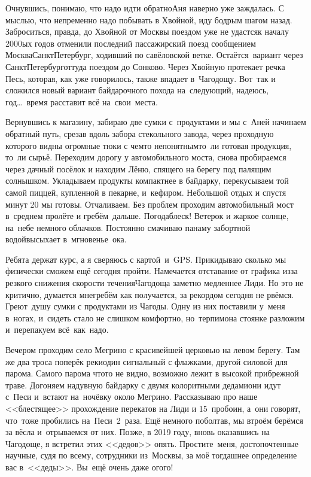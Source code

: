 Очнувшись, понимаю, что надо идти обратно\mdash Аня наверно уже заждалась. С мыслью, что непременно надо побывать в Хвойной, иду бодрым шагом назад. Заброситься, правда, до Хвойной от Москвы поездом уже не удастся\mdash к началу 2000\sdash ых годов отменили последний пассажирский поезд сообщением Москва\mdash Санкт\sdash Петербург, ходивший по савёловской ветке. Остаётся~вариант через Санкт\sdash Петербург\mdash оттуда поездом до Сонково. Через Хвойную протекает речка Песь, которая, как уже говорилось, также впадает в~Чагодощу. Вот~так и сложился новый вариант байдарочного похода на~следующий, надеюсь, год\ldots~время расставит всё на~свои~места.

Вернувшись к магазину, забираю две сумки с~продуктами и мы с~Аней начинаем обратный путь, срезав вдоль забора стекольного завода, через проходную которого видны огромные тюки с чем\sdash то непонятным\mdash то~ли готовая продукция, то~ли сырьё. Переходим дорогу у автомобильного моста, снова пробираемся через дачный посёлок и находим Лёню, спящего на берегу под палящим солнышком. Укладываем продукты компактнее в байдарку, перекусываем той самой пиццей, купленной в пекарне, и~кефиром. Небольшой отдых и спустя минут 20 мы готовы. Отчаливаем. Без проблем проходим автомобильный мост в~среднем пролёте и гребём~дальше. Погода\mdash блеск! Ветерок и жаркое солнце, на~небе немного облачков. Постоянно смачиваю панаму забортной водой\mdash высыхает в~мгновенье~ока. 

Ребята держат курс, а я сверяюсь с картой~и~GPS. Прикидываю сколько мы физически сможем ещё сегодня пройти. Намечается отставание от графика из\sdash за резкого снижения скорости течения\mdash Чагодоща заметно медленнее Лиди. Но это не критично, думается мне\mdash гребём как получается, за рекордом сегодня не рвёмся. Греют~душу сумки с продуктами из Чагоды. Одну из них поставили у~меня в~ногах, и~сидеть стало не слишком комфортно, но~терпимо\mdash на стоянке разложим и~перепакуем всё~как~надо. 

Вечером проходим село Мегрино с красивейшей церковью на левом берегу. Там же два троса поперёк реки\mdash один сигнальный с флажками, другой силовой для парома. Самого парома что\sdash то не видно, возможно лежит в высокой прибрежной траве. Догоняем надувную байдарку с двумя колоритными дедами\mdash они идут с~Песи и~встают на~ночёвку около Мегрино. Рассказываю про наше <<блестящее>> прохождение перекатов на Лиди и 15~пробоин, а~они говорят, что~тоже пробились на~Песи~2~раза. Ещё немного поболтав, мы втроём берёмся за вёсла и~отрываемся от них. Позже, в 2019 году, вновь оказавшись на Чагодоще, я встретил этих <<дедов>> опять. Простите~меня, достопочтенные научные, судя по всему, сотрудники из~Москвы, за моё тогдашнее определение вас в~<<деды>>. Вы~ещё очень даже ого\sdash го!

